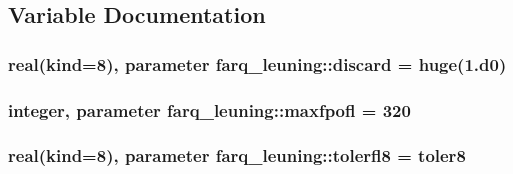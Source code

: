 \subsection{Variable Documentation}
\hypertarget{namespacefarq__leuning_a31a2c362c8646a0912470a61a19135b2}{}
\subsubsection[{discard}]{\setlength{\rightskip}{0pt plus 5cm}real(kind=8), parameter farq\+\_\+leuning\+::discard = huge(1.d0)}\label{namespacefarq__leuning_a31a2c362c8646a0912470a61a19135b2}
\hypertarget{namespacefarq__leuning_ae18ccfcc4ad61a2d80f126c65258fffd}{}
\subsubsection[{maxfpofl}]{\setlength{\rightskip}{0pt plus 5cm}integer, parameter farq\+\_\+leuning\+::maxfpofl = 320}\label{namespacefarq__leuning_ae18ccfcc4ad61a2d80f126c65258fffd}
\hypertarget{namespacefarq__leuning_a544a9b3986d12bf60c748eff03f49665}{}
\subsubsection[{tolerfl8}]{\setlength{\rightskip}{0pt plus 5cm}real(kind=8), parameter farq\+\_\+leuning\+::tolerfl8 = toler8}\label{namespacefarq__leuning_a544a9b3986d12bf60c748eff03f49665}
